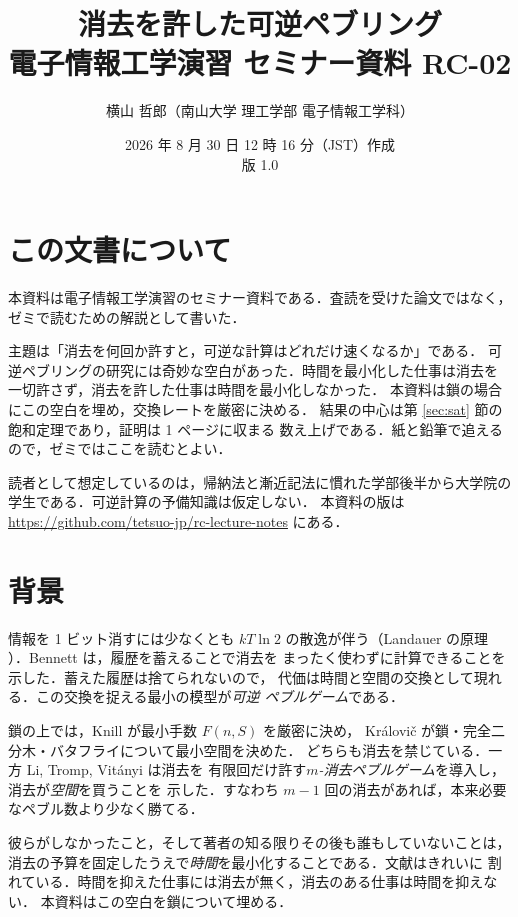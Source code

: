 \documentclass[a4paper,11pt]{jsarticle}
\title{消去を許した可逆ペブリング\\
\large 電子情報工学演習 セミナー資料 RC-02}
\author{横山 哲郎（南山大学 理工学部 電子情報工学科）}
\date{2026 年 8 月 30 日 12 時 16 分（JST）作成\\版 1.0}
\theoremstyle{definition}
\begin{document}
\maketitle

\section{この文書について}
本資料は電子情報工学演習のセミナー資料である．査読を受けた論文ではなく，
ゼミで読むための解説として書いた．

主題は「消去を何回か許すと，可逆な計算はどれだけ速くなるか」である．
可逆ペブリングの研究には奇妙な空白があった．時間を最小化した仕事は消去を
一切許さず，消去を許した仕事は時間を最小化しなかった．
本資料は鎖の場合にこの空白を埋め，交換レートを厳密に決める．
結果の中心は第 \ref{sec:sat} 節の飽和定理であり，証明は 1 ページに収まる
数え上げである．紙と鉛筆で追えるので，ゼミではここを読むとよい．

読者として想定しているのは，帰納法と漸近記法に慣れた学部後半から大学院の
学生である．可逆計算の予備知識は仮定しない．
本資料の版は \url{https://github.com/tetsuo-jp/rc-lecture-notes} にある．

\section{背景}
情報を 1 ビット消すには少なくとも $kT\ln 2$ の散逸が伴う（Landauer の原理
\cite{Land61}）．Bennett \cite{Benn73,Benn89} は，履歴を蓄えることで消去を
まったく使わずに計算できることを示した．蓄えた履歴は捨てられないので，
代価は時間と空間の交換として現れる．この交換を捉える最小の模型が\emph{可逆
ペブルゲーム}である．

鎖の上では，Knill \cite{Knill95} が最小手数 $F(n,S)$ を厳密に決め，
Kr\'alovi\v{c} \cite{Kral04} が鎖・完全二分木・バタフライについて最小空間を決めた．
どちらも消去を禁じている．一方 Li, Tromp, Vit\'anyi \cite{LiTV98} は消去を
有限回だけ許す\emph{$m$-消去ペブルゲーム}を導入し，消去が\emph{空間}を買うことを
示した．すなわち $m-1$ 回の消去があれば，本来必要なペブル数より少なく勝てる．

彼らがしなかったこと，そして著者の知る限りその後も誰もしていないことは，
消去の予算を固定したうえで\emph{時間}を最小化することである．文献はきれいに
割れている．時間を抑えた仕事には消去が無く，消去のある仕事は時間を抑えない．
本資料はこの空白を鎖について埋める．
\end{document}
